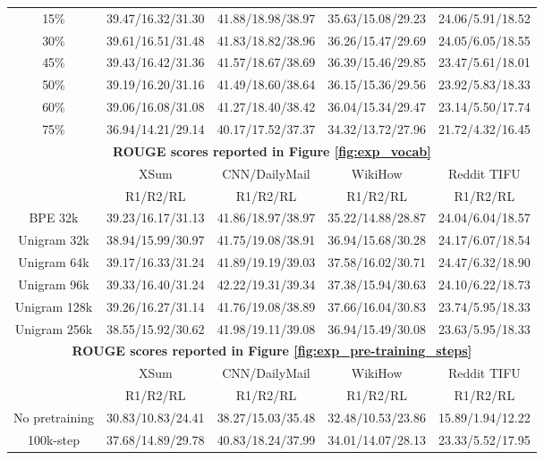 \begin{table}[hbt!]
\begin{tabular}{ccccc}
    15\%  & 39.47/16.32/31.30 & 41.88/18.98/38.97 & 35.63/15.08/29.23 & 24.06/5.91/18.52 \\ 
    30\%   & 39.61/16.51/31.48 & 41.83/18.82/38.96 & 36.26/15.47/29.69 & 24.05/6.05/18.55 \\ 
    45\%  & 39.43/16.42/31.36 & 41.57/18.67/38.69 & 36.39/15.46/29.85 & 23.47/5.61/18.01 \\ 
    50\%   & 39.19/16.20/31.16 & 41.49/18.60/38.64 & 36.15/15.36/29.56 & 23.92/5.83/18.33 \\ 
    60\%   & 39.06/16.08/31.08 & 41.27/18.40/38.42 & 36.04/15.34/29.47 & 23.14/5.50/17.74 \\ 
    75\%  & 36.94/14.21/29.14 & 40.17/17.52/37.37 & 34.32/13.72/27.96 & 21.72/4.32/16.45 \\  \hline
    \multicolumn{5}{c}{\textbf{ROUGE scores reported in Figure \ref{fig:exp_vocab}}} \\\hline
    & XSum & CNN/DailyMail & WikiHow & Reddit TIFU \\
    & R1/R2/RL & R1/R2/RL &  R1/R2/RL & R1/R2/RL \\\hline 
    BPE 32k         & 39.23/16.17/31.13 & 41.86/18.97/38.97 & 35.22/14.88/28.87 & 24.04/6.04/18.57 \\ 
    Unigram 32k     & 38.94/15.99/30.97 & 41.75/19.08/38.91 & 36.94/15.68/30.28 & 24.17/6.07/18.54 \\ 
    Unigram 64k     & 39.17/16.33/31.24 & 41.89/19.19/39.03 & 37.58/16.02/30.71 & 24.47/6.32/18.90 \\ 
    Unigram 96k     & 39.33/16.40/31.24 & 42.22/19.31/39.34 & 37.38/15.94/30.63 & 24.10/6.22/18.73 \\
    Unigram 128k    & 39.26/16.27/31.14 & 41.76/19.08/38.89 & 37.66/16.04/30.83 & 23.74/5.95/18.33 \\ 
    Unigram 256k    & 38.55/15.92/30.62 & 41.98/19.11/39.08 & 36.94/15.49/30.08 & 23.63/5.95/18.33  \\ \hline
    \multicolumn{5}{c}{\textbf{ROUGE scores reported in Figure \ref{fig:exp_pre-training_steps}}} \\\hline
    & XSum & CNN/DailyMail & WikiHow & Reddit TIFU \\
    & R1/R2/RL & R1/R2/RL &  R1/R2/RL & R1/R2/RL \\\hline 
    No pretraining  & 30.83/10.83/24.41 & 38.27/15.03/35.48 & 32.48/10.53/23.86 & 15.89/1.94/12.22 \\ 
    100k-step       & 37.68/14.89/29.78 & 40.83/18.24/37.99 & 34.01/14.07/28.13 & 23.33/5.52/17.95 \\ 

\end{tabular}
\end{table}

